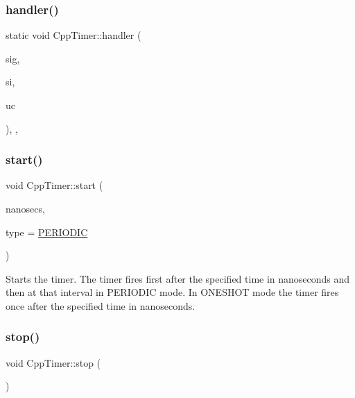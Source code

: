 \subsubsection{\texorpdfstring{handler()}{handler()}}
{\footnotesize\ttfamily static void Cpp\+Timer\+::handler (\begin{DoxyParamCaption}\item[{int}]{sig,  }\item[{siginfo\+\_\+t $\ast$}]{si,  }\item[{void $\ast$}]{uc }\end{DoxyParamCaption})\hspace{0.3cm}{\ttfamily [inline]}, {\ttfamily [static]}, {\ttfamily [private]}}

\mbox{\label{classCppTimer_a64989025caa3c030c6c397ca76a2d20b}} 
\subsubsection{\texorpdfstring{start()}{start()}}
{\footnotesize\ttfamily void Cpp\+Timer\+::start (\begin{DoxyParamCaption}\item[{long}]{nanosecs,  }\item[{\hyperlink{CppTimer_8h_a110d07ab6a96d7815149d3d95435790a}{cpp\+Timer\+Type\+\_\+t}}]{type = {\ttfamily \hyperlink{CppTimer_8h_a110d07ab6a96d7815149d3d95435790aae4379d044711537d9ce3b3b58c575c58}{P\+E\+R\+I\+O\+D\+IC}} }\end{DoxyParamCaption})\hspace{0.3cm}{\ttfamily [virtual]}}

Starts the timer. The timer fires first after the specified time in nanoseconds and then at that interval in P\+E\+R\+I\+O\+D\+IC mode. In O\+N\+E\+S\+H\+OT mode the timer fires once after the specified time in nanoseconds. \mbox{\label{classCppTimer_a4bb95ddee98a536d0818b8f6096bf7e7}} 
\subsubsection{\texorpdfstring{stop()}{stop()}}
{\footnotesize\ttfamily void Cpp\+Timer\+::stop (\begin{DoxyParamCaption}{ }\end{DoxyParamCaption})\hspace{0.3cm}{\ttfamily [virtual]}}

